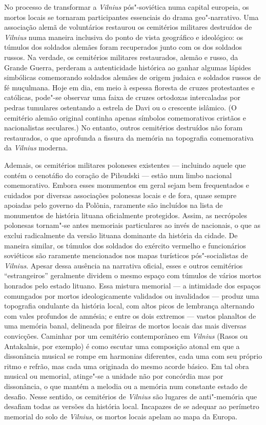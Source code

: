 No processo de transformar a \textit{Vilnius} pós"-soviética numa capital
europeia, os mortos locais se tornaram participantes essenciais do drama
geo"-narrativo. Uma associação alemã de voluntários restaurou os
cemitérios militares destruídos de \textit{Vilnius} numa maneira inclusiva do
ponto de vista geográfico e ideológico: os túmulos dos soldados alemães
foram recuperados junto com os dos soldados russos. Na verdade, os
cemitérios militares restaurados, alemão e russo, da Grande Guerra,
perderam a autenticidade histórica ao ganhar algumas lápides simbólicas
comemorando soldados alemães de origem judaica e soldados russos de fé
muçulmana. Hoje em dia, em meio à espessa floresta de cruzes
protestantes e católicas, pode"-se observar uma faixa de cruzes ortodoxas
intercaladas por pedras tumulares ostentando a estrela de Davi ou o
crescente islâmico. (O cemitério alemão original continha apenas
símbolos comemorativos cristãos e nacionalistas seculares.) No entanto,
outros cemitérios destruídos não foram restaurados, o que aprofunda a
fissura da memória na topografia comemorativa da \textit{Vilnius} moderna.

Ademais, os cemitérios militares poloneses existentes --- incluindo aquele
que contém o cenotáfio do coração de Piłsudski --- estão num limbo
nacional comemorativo. Embora esses monumentos em geral sejam bem
frequentados e cuidados por diversas associações polonesas locais e de
fora, quase sempre apoiadas pelo governo da Polônia, raramente são
incluídos na lista de monumentos de história lituana oficialmente
protegidos. Assim, as necrópoles polonesas tornam"-se antes memoriais
particulares ao invés de nacionais, o que as exclui radicalmente da
versão lituana dominante da história da cidade. De maneira similar, os
túmulos dos soldados do exército vermelho e funcionários soviéticos são
raramente mencionados nos mapas turísticos pós"-socialistas de \textit{Vilnius}.
Apesar dessa ausência na narrativa oficial, esses e outros cemitérios
``estrangeiros'' geralmente dividem o mesmo espaço com túmulos de vários
mortos honrados pelo estado lituano. Essa mistura memorial --- a
intimidade dos espaços comungados por mortos ideologicamente validados
ou invalidados --- produz uma topografia ondulante da história local, com
altos picos de lembrança alternando com vales profundos de amnésia; e
entre os dois extremos --- vastos planaltos de uma memória banal,
delineada por fileiras de mortos locais das mais diversas convicções.
Caminhar por um cemitério contemporâneo em \textit{Vilnius} (Rasos ou Antakalnis,
por exemplo) é como escutar uma composição atonal em que a dissonância
musical se rompe em harmonias diferentes, cada uma com seu próprio ritmo
e refrão, mas cada uma originada do mesmo acorde básico. Em tal obra
musical ou memorial, atinge"-se a unidade não por concórdia mas por
dissonância, o que mantém a melodia ou a memória num constante estado de
desafio. Nesse sentido, os cemitérios de \textit{Vilnius} são lugares de
anti"-memória que desafiam todas as versões da história local. Incapazes
de se adequar ao perímetro memorial do solo de \textit{Vilnius}, os mortos locais
apelam ao mapa da Europa.

